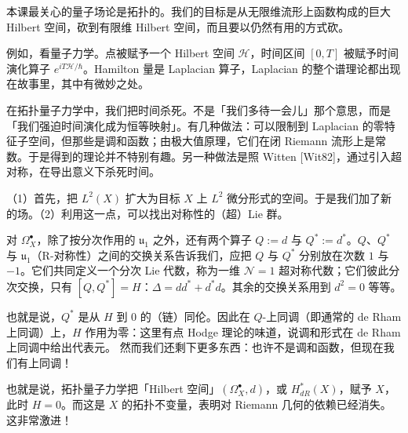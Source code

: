 本课最关心的量子场论是拓扑的。我们的目标是从无限维流形上函数构成的巨大 Hilbert 空间，砍到有限维 Hilbert 空间，而且要以仍然有用的方式砍。

例如，看量子力学。点被赋予一个 Hilbert 空间 $\mathcal{H}$，时间区间 $[0,T]$ 被赋予时间演化算子 $e^{iT\mathcal{H}/\hbar}$。Hamilton 量是 Laplacian 算子，Laplacian 的整个谱理论都出现在故事里，其中有微妙之处。

在拓扑量子力学中，我们把时间杀死。不是「我们多待一会儿」那个意思，而是「我们强迫时间演化成为恒等映射」。有几种做法：可以限制到 Laplacian 的零特征子空间，但那些是调和函数；由极大值原理，它们在闭 Riemann 流形上是常数。于是得到的理论并不特别有趣。另一种做法是照 Witten [Wit82]，通过引入超对称，在导出意义下杀死时间。

（1）首先，把 $L^2(X)$ 扩大为目标 $X$ 上 $L^2$ 微分形式的空间。于是我们加了新的场。（2）利用这一点，可以找出对称性的（超）Lie 群。

对 $\Omega^\bullet_X$，除了按分次作用的 $\mathfrak{u}_1$ 之外，还有两个算子 $Q := d$ 与 $Q^* := d^*$。$Q$、$Q^*$ 与 $\mathfrak{u}_1$（R-对称性）之间的交换关系告诉我们，应把 $Q$ 与 $Q^*$ 分别放在次数 $1$ 与 $-1$。它们共同定义一个分次 Lie 代数，称为一维 $\mathcal{N} = 1$ 超对称代数；它们彼此分次交换，只有 $[Q,Q^*] = H$：$\Delta = dd^* + d^*d$。其余的交换关系用到 $d^2 = 0$ 等等。

也就是说，$Q^*$ 是从 $H$ 到 $0$ 的（链）同伦。因此在 $Q$-上同调（即通常的 de Rham 上同调）上，$H$ 作用为零：这里有点 Hodge 理论的味道，说调和形式在 de Rham 上同调中给出代表元。
然而我们还剩下更多东西：也许不是调和函数，但现在我们有上同调！

也就是说，拓扑量子力学把「Hilbert 空间」$(\Omega^\bullet_X, d)$，或 $H^*_{dR}(X)$，赋予 $X$，此时 $H = 0$。而这是 $X$ 的拓扑不变量，表明对 Riemann 几何的依赖已经消失。这非常激进！
